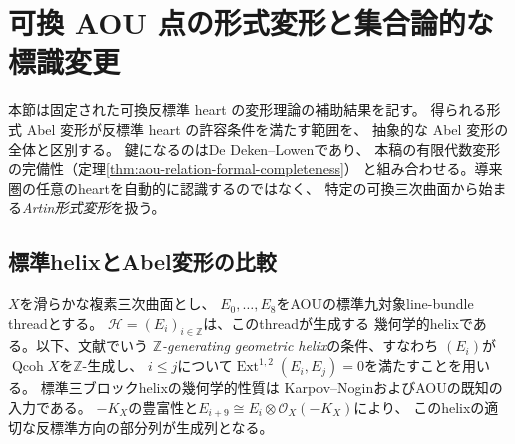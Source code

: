 \section{可換 AOU 点の形式変形と集合論的な標識変更}
\label{sec:formal-abelian-recognition}
本節は固定された可換反標準 heart の変形理論の補助結果を記す。
得られる形式 Abel 変形が反標準 heart の許容条件を満たす範囲を、
抽象的な Abel 変形の全体と区別する。
鍵になるのはDe Deken--Lowen\cite[Theorems 4.5, 5.13, 5.15]{DDL}であり、
本稿の有限代数変形の完備性（定理\ref{thm:aou-relation-formal-completeness}）
と組み合わせる。導来圏の任意のheartを自動的に認識するのではなく、
特定の可換三次曲面から始まる\emph{Artin形式変形}を扱う。

\subsection{標準helixとAbel変形の比較}
$X$を滑らかな複素三次曲面とし、
$E_0,\ldots,E_8$をAOUの標準九対象line-bundle threadとする。
$\mathscr H=(E_i)_{i\in\mathbb Z}$は、このthreadが生成する
幾何学的helixである。以下、文献でいう
\emph{$\mathbb Z$-generating geometric helix}の条件、すなわち
$(E_i)$が$\operatorname{Qcoh}X$を$\mathbb Z$-生成し、
$i\le j$について$\operatorname{Ext}^{1,2}(E_i,E_j)=0$を満たすことを用いる。
標準三ブロックhelixの幾何学的性質は
Karpov--Nogin\cite{KN}およびAOU\cite[\S4]{AOU}の既知の入力である。
$-K_X$の豊富性と$E_{i+9}\cong E_i\otimes\mathcal O_X(-K_X)$により、
このhelixの適切な反標準方向の部分列が生成列となる。

